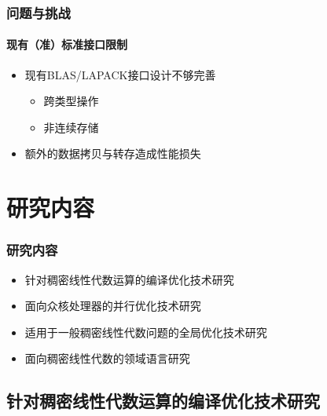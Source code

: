 \documentclass[aspectratio=169]{beamer}
\begin{document}
\begin{frame}
  \frametitle{问题与挑战}
  \framesubtitle{现有（准）标准接口限制}
  \begin{itemize}
  \item 现有BLAS/LAPACK接口设计不够完善
    \begin{itemize}
    \item 跨类型操作
    \item 非连续存储
    \end{itemize}
  \item 额外的数据拷贝与转存造成性能损失
  \end{itemize}
\end{frame}

\section{研究内容}

\begin{frame}
  \frametitle{研究内容}
  \begin{itemize}
  \item 针对稠密线性代数运算的编译优化技术研究
  \item 面向众核处理器的并行优化技术研究
  \item 适用于一般稠密线性代数问题的全局优化技术研究
  \item 面向稠密线性代数的领域语言研究
  \end{itemize}
\end{frame}

\subsection[编译优化技术研究]{针对稠密线性代数运算的编译优化技术研究}
\end{document}

